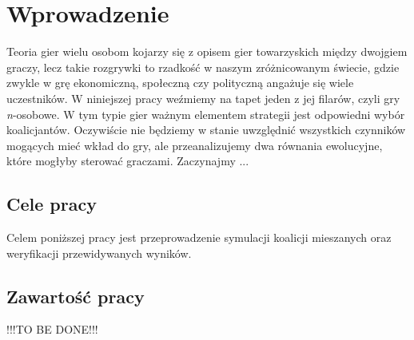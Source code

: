 \chapter{Wprowadzenie}
\label{cha:wprowadzenie}

Teoria gier wielu osobom kojarzy się z opisem gier towarzyskich między dwojgiem graczy, lecz takie rozgrywki to rzadkość w naszym zróżnicowanym świecie, gdzie zwykle w grę ekonomiczną, społeczną czy polityczną angażuje się wiele uczestników. 
W niniejszej pracy weźmiemy na tapet jeden z jej filarów, czyli gry \textit{n}-osobowe. W tym typie gier ważnym elementem strategii jest odpowiedni wybór koalicjantów. Oczywiście nie będziemy w stanie uwzględnić wszystkich czynników mogących mieć wkład do gry, ale przeanalizujemy dwa równania ewolucyjne, które mogłyby sterować graczami. Zaczynajmy ...


\section{Cele pracy}
\label{sec:celePracy}

Celem poniższej pracy jest przeprowadzenie symulacji koalicji mieszanych oraz weryfikacji przewidywanych wyników.



\section{Zawartość pracy}
\label{sec:zawartoscPracy}

!!!TO BE DONE!!! \cite{Now06} \cite{Hof98} \cite{Str01} \cite{Qt} \cite{Tut} \cite{Sza}